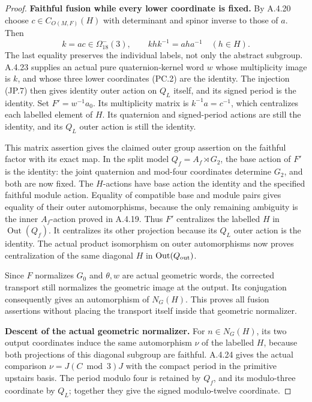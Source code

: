 \begin{proof}
\par\medskip\noindent\textbf{Faithful fusion while every lower coordinate is fixed.}\quad
By A.4.20 choose \(c\in C_{O(M,F)}(H)\) with
determinant and spinor inverse to those of \(a\).
Then
\[
               k=ac\in\Omega_{18}^-(3),\qquad
               khk^{-1}=aha^{-1}\quad(h\in H).
 \tag{TF.15}
\]
The last equality preserves the individual labels,
not only the abstract subgroup.
A.4.23 supplies an actual pure quaternion-kernel word
\(w\) whose multiplicity image is \(k\), and whose
three lower coordinates (PC.2) are the identity.
The injection (JP.7) then gives identity outer action
on \(Q_L\) itself, and its signed period is the identity.
Set \(F'=w^{-1}a_0\).
Its multiplicity matrix is \(k^{-1}a=c^{-1}\), which
centralizes each labelled element of \(H\).
Its quaternion and signed-period actions are still
the identity, and its \(Q_L\) outer action is still
the identity.

This matrix assertion gives the claimed outer group
assertion on the faithful factor with its exact map.
In the split model
\(Q_f=A_f\rtimes G_2\), the base action of \(F'\)
is the identity: the joint quaternion and mod-four
coordinates determine \(G_2\), and both are now
fixed. The \(H\)-actions have base action the identity
and the specified faithful module action.
Equality of compatible base and module pairs gives
equality of their outer automorphisms, because the
only remaining ambiguity is the inner \(A_f\)-action
proved in A.4.19. Thus \(F'\) centralizes the labelled
\(H\) in \(\operatorname{Out}(Q_f)\).
It centralizes its other projection because its
\(Q_L\) outer action is the identity.
The actual product isomorphism on outer automorphisms
now proves centralization of the same diagonal \(H\)
in \(\operatorname{Out}(Q_{\rm out})\).

Since \(F\) normalizes \(G_0\) and \(\theta,w\) are
actual geometric words, the corrected transport still
normalizes the geometric image at the output.
Its conjugation consequently gives an automorphism
of \(N_G(H)\). This proves all fusion assertions
without placing the transport itself inside that
geometric normalizer.

\par\medskip\noindent\textbf{Descent of the actual geometric normalizer.}\quad
For \(n\in N_G(H)\), its two output coordinates
induce the same automorphism \(\nu\) of the labelled
\(H\), because both projections of this diagonal
subgroup are faithful. A.4.24 gives the actual
comparison \(\nu=J(C\bmod3)J\) with the compact
period in the primitive upstairs basis.
The period modulo four is retained by \(Q_f\),
and its modulo-three coordinate by \(Q_L\); together
they give the signed modulo-twelve coordinate.


\end{proof}
